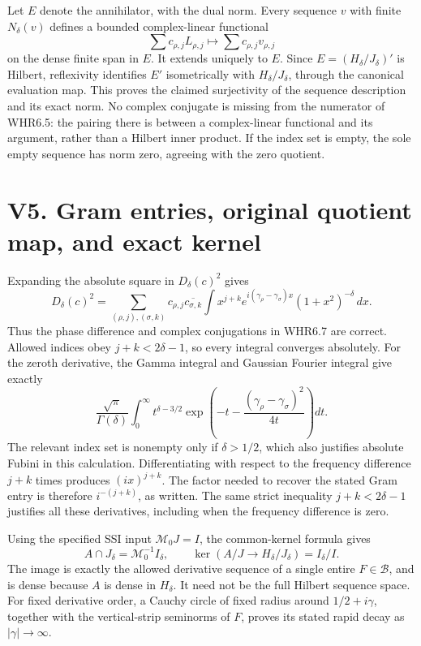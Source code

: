 Let \(E\) denote the annihilator, with the dual norm. Every sequence
\(v\) with finite \(N_\delta(v)\) defines a bounded complex-linear
functional \[
\sum c_{\rho,j}L_{\rho,j}\longmapsto
\sum c_{\rho,j}v_{\rho,j}
\] on the dense finite span in \(E\). It extends uniquely to \(E\).
Since \(E=(H_\delta/J_\delta)'\) is Hilbert, reflexivity identifies
\(E'\) isometrically with \(H_\delta/J_\delta\), through the canonical
evaluation map. This proves the claimed surjectivity of the sequence
description and its exact norm. No complex conjugate is missing from the
numerator of WHR6.5: the pairing there is between a complex-linear
functional and its argument, rather than a Hilbert inner product. If the
index set is empty, the sole empty sequence has norm zero, agreeing with
the zero quotient.

\section{V5. Gram entries, original quotient map, and exact
kernel}\label{v5.-gram-entries-original-quotient-map-and-exact-kernel}

Expanding the absolute square in \(D_\delta(c)^2\) gives \[
D_\delta(c)^2
=\sum_{(\rho,j),(\sigma,k)}
c_{\rho,j}\overline{c_{\sigma,k}}
\int x^{j+k}e^{i(\gamma_\rho-\gamma_\sigma)x}
(1+x^2)^{-\delta}\,dx.
\] Thus the phase difference and complex conjugations in WHR6.7 are
correct. Allowed indices obey \(j+k<2\delta-1\), so every integral
converges absolutely. For the zeroth derivative, the Gamma integral and
Gaussian Fourier integral give exactly \[
\frac{\sqrt\pi}{\Gamma(\delta)}
\int_0^\infty t^{\delta-3/2}
\exp\left(-t-\frac{(\gamma_\rho-\gamma_\sigma)^2}{4t}\right)dt.
\] The relevant index set is nonempty only if \(\delta>1/2\), which also
justifies absolute Fubini in this calculation. Differentiating with
respect to the frequency difference \(j+k\) times produces
\((ix)^{j+k}\). The factor needed to recover the stated Gram entry is
therefore \(i^{-(j+k)}\), as written. The same strict inequality
\(j+k<2\delta-1\) justifies all these derivatives, including when the
frequency difference is zero.

Using the specified SSI input \(\mathcal M_0J=I\), the common-kernel
formula gives \[
A\cap J_\delta=\mathcal M_0^{-1}I_\delta,
\qquad
\ker(A/J\longrightarrow H_\delta/J_\delta)=I_\delta/I.
\] The image is exactly the allowed derivative sequence of a single
entire \(F\in\mathcal B\), and is dense because \(A\) is dense in
\(H_\delta\). It need not be the full Hilbert sequence space. For fixed
derivative order, a Cauchy circle of fixed radius around
\(1/2+i\gamma\), together with the vertical-strip seminorms of \(F\),
proves its stated rapid decay as \(|\gamma|\to\infty\).

